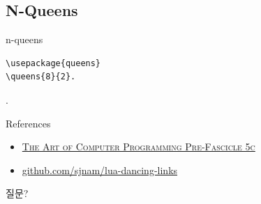 \documentclass{beamer}
\begin{document}
\subsection{N-Queens}

%
\begin{frame}[fragile]{n-queens}
\begin{verbatim}
\usepackage{queens}
\queens{8}{2}.
\end{verbatim}
\vspace{-10mm}
.
\end{frame}

%
\begin{frame}{References}
  \begin{itemize}
  \item \href{http://www-cs-faculty.stanford.edu/~knuth/fasc5c.ps.gz}
    {\textsc{The Art of Computer Programming Pre-Fascicle 5c}}
  \item \href{https://github.com/sjnam/lua-dancing-links}
    {github.com/sjnam/lua-dancing-links}
  \end{itemize}
\end{frame}

%
\begin{frame}[standout]
  질문?
\end{frame}
\end{document}
